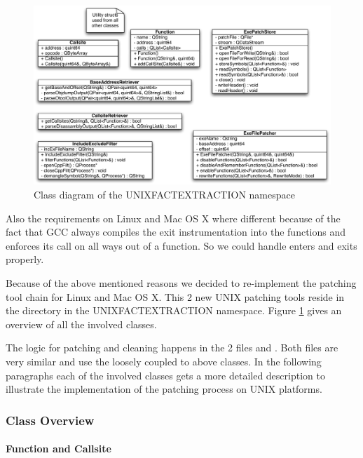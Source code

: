 \begin{figure}[ht]
\centering
\includegraphics[width=16cm]{images/unixpatchtools}
\caption{Class diagram of the UNIXFACTEXTRACTION namespace} \label{fig:unixfe_unixfe}
\end{figure}

Also the requirements on Linux and Mac OS X where different because of the fact that GCC always compiles the exit instrumentation into the functions and enforces its call on all ways out of a function.  So we could handle enters and exits properly.

Because of the above mentioned reasons we decided to re-implement the patching tool chain for Linux and Mac OS X.  This 2 new UNIX patching tools reside in the  directory in the UNIXFACTEXTRACTION namespace.  Figure \ref{fig:unixfe_unixfe} gives an overview of all the involved classes.

The logic for patching and cleaning happens in the 2 files  and .  Both files are very similar and use the loosely coupled to above classes.  In the following paragraphs each of the involved classes gets a more detailed description to illustrate the implementation of the patching process on UNIX platforms.

\subsubsection{Class Overview}

\paragraph{Function and Callsite}

